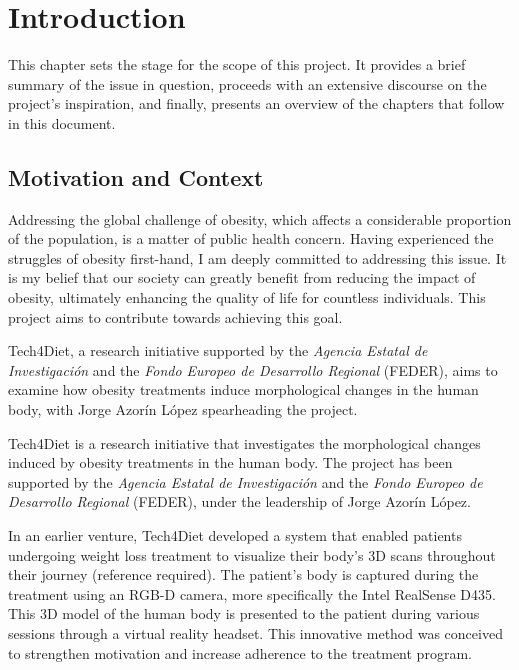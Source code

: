 \chapter{Introduction}

This chapter sets the stage for the scope of this project. It provides a brief
summary of the issue in question, proceeds with an extensive discourse on the
project's inspiration, and finally, presents an overview of the chapters that
follow in this document.

\section{Motivation and Context}

Addressing the global challenge of obesity, which affects a considerable
proportion of the population, is a matter of public health concern. Having
experienced the struggles of obesity first-hand, I am deeply committed to
addressing this issue. It is my belief that our society can greatly benefit
from reducing the impact of obesity, ultimately enhancing the quality of life
for countless individuals. This project aims to contribute towards achieving
this goal.

Tech4Diet, a research initiative supported by the \textit{Agencia Estatal de
	Investigación} and the \textit{Fondo Europeo de Desarrollo Regional} (FEDER),
aims to examine how obesity treatments induce morphological changes in the
human body, with Jorge Azorín López spearheading the project.

Tech4Diet is a research initiative that investigates the morphological changes
induced by obesity treatments in the human body. The project has been supported
by the \textit{Agencia Estatal de Investigación} and the \textit{Fondo Europeo
	de Desarrollo Regional} (FEDER), under the leadership of Jorge Azorín López.

In an earlier venture, Tech4Diet developed a system that enabled patients
undergoing weight loss treatment to visualize their body's 3D scans throughout
their journey (reference required). The patient's body is captured during the
treatment using an RGB-D camera, more specifically the Intel RealSense D435.
This 3D model of the human body is presented to the patient during various
sessions through a virtual reality headset. This innovative method was
conceived to strengthen motivation and increase adherence to the treatment
program.


